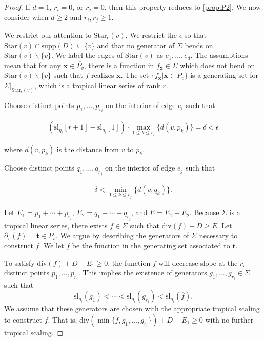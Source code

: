 \documentclass{amsart}
\begin{document}
	\begin{proof}
		If $d = 1$, $r_i = 0$, or $r_j = 0$, then this property reduces to \ref{prop:P2}. We now consider when $d \geq 2$ and $r_i, r_j \geq 1$.
		
		We restrict our attention to $\mathrm{Star}_{\epsilon}(v)$. We restrict the $\epsilon$ so that $\mathrm{Star}(v) \cap \mathrm{supp}(D) \subseteq \{ v \}$ and that no generator of $\Sigma$ bends on $\mathrm{Star}(v) \backslash \{ v \}$. We label the edges of $\mathrm{Star}(v)$ as $e_1, \ldots, e_d$. The assumptions mean that for any $\mathbf{x} \in \overline{P_v}$, there is a function in $f_{\mathbf{x}} \in \Sigma$ which does not bend on $\mathrm{Star}(v) \backslash \{ v \}$ such that $f$ realizes $\mathbf{x}$. The set $\{ f_{\mathbf{x}} | \mathbf{x} \in \overline{P_v} \}$ is a generating set for $\Sigma|_{\mathrm{Star}_{\epsilon}(v)}$, which is a tropical linear series of rank $r$.
		
		Choose distinct points $p_1, \ldots, p_{r_i}$ on the interior of edge $e_i$ such that 
		
		\begin{align}
			(\mathrm{sl}_{\eta_i}[r+1] - \mathrm{sl}_{\eta_i}[1]) \cdot \max_{1 \leq k \leq r_i} \{ d(v,p_k) \} = \delta < \epsilon \label{Inequal:edge-i-restriction}
		\end{align}
		
		where $d(v,p_k)$ is the distance from $v$ to $p_k$.
		
		Choose distinct points $q_1, \ldots , q_{r_j}$ on the interior of edge $e_j$ such that 
		
		\begin{align}
			\delta < \min_{1 \leq k \leq r_j} \{ d(v,q_k) \}. \label{Inequal:edge-j-restriction}
		\end{align}
		
		Let $E_1 = p_1 + \cdots + p_{r_i}$, $E_2 = q_1 + \cdots + q_{r_j}$, and $E = E_1 + E_2$. Because $\Sigma$ is a tropical linear series, there exists $f \in \Sigma$ such that $\mathrm{div}(f) + D \geq E$. Let $\partial_v(f) = \mathbf{t} \in \overline{P_v}$. We argue by describing the generators of $\Sigma$ necessary to construct $f$. We let $\overline{f}$ be the function in the generating set associated to $\mathbf{t}$.
		
		To satisfy $\mathrm{div}(f) + D - E_1 \geq 0$, the function $f$ will decrease slope at the $r_i$ distinct points $p_1, \ldots, p_{r_i}$. This implies the existence of generators $g_1, \ldots, g_{r_i} \in \Sigma$ such that $$\mathrm{sl}_{\eta_i}(g_1) < \cdots < \mathrm{sl}_{\eta_i}(g_{r_i}) < \mathrm{sl}_{\eta_i}(\overline{f}).$$ We assume that these generators are chosen with the appropriate tropical scaling to construct $f$. That is, $\mathrm{div}(\min \{ \overline{f}, g_1, \ldots, g_{r_i} \}) + D - E_1 \geq 0$ with no further tropical scaling.
		

\end{proof}
\end{document}
